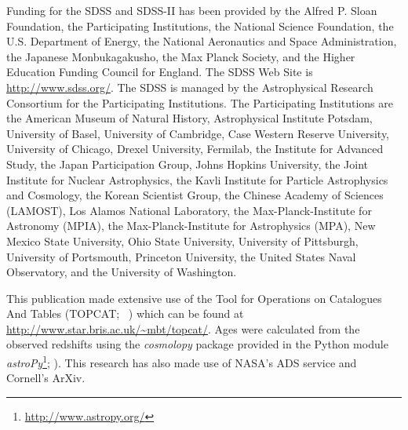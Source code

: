 \documentclass[useAMS,usenatbib]{mn2e}
\begin{document}
Funding for the SDSS and SDSS-II has been provided by the Alfred P. Sloan Foundation, the Participating Institutions, the National Science Foundation, the U.S. Department of Energy, the National Aeronautics and Space Administration, the Japanese Monbukagakusho, the Max Planck Society, and the Higher Education Funding Council for England. The SDSS Web Site is \url{http://www.sdss.org/}.
The SDSS is managed by the Astrophysical Research Consortium for the Participating Institutions. The Participating Institutions are the American Museum of Natural History, Astrophysical Institute Potsdam, University of Basel, University of Cambridge, Case Western Reserve University, University of Chicago, Drexel University, Fermilab, the Institute for Advanced Study, the Japan Participation Group, Johns Hopkins University, the Joint Institute for Nuclear Astrophysics, the Kavli Institute for Particle Astrophysics and Cosmology, the Korean Scientist Group, the Chinese Academy of Sciences (LAMOST), Los Alamos National Laboratory, the Max-Planck-Institute for Astronomy (MPIA), the Max-Planck-Institute for Astrophysics (MPA), New Mexico State University, Ohio State University, University of Pittsburgh, University of Portsmouth, Princeton University, the United States Naval Observatory, and the University of Washington.

This publication made extensive use of the Tool for Operations on Catalogues And Tables (TOPCAT; ~\citealt{Taylor05}) which can be found at \url{http://www.star.bris.ac.uk/~mbt/topcat/}. Ages were calculated from the observed redshifts using the \emph{cosmolopy} package provided in the Python module \emph{astroPy}\footnote{\url{http://www.astropy.org/}}; \citealt{Rob13}). This research has also made use of NASA's ADS service and Cornell's ArXiv. 
\end{document}
